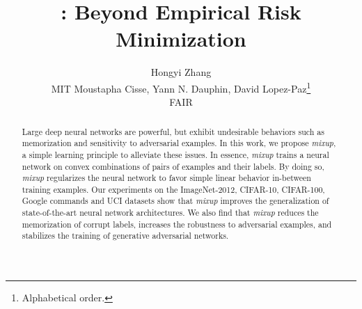 \documentclass{article}
\title{\mixup{}: Beyond Empirical Risk Minimization}
\author{%
Hongyi Zhang \\
MIT
\And
Moustapha Cisse, Yann N. Dauphin, David Lopez-Paz\thanks{Alphabetical order.} \\
FAIR
}
\newcommand{\mixup}{\emph{mixup}}
\begin{document}
    \maketitle
    \begin{abstract}
        Large deep neural networks are powerful, but exhibit undesirable
        behaviors such as memorization and sensitivity to adversarial examples.
        In this work, we propose \mixup{}, a simple learning principle to
        alleviate these issues. In essence, \mixup{} trains a neural network on
        convex combinations of pairs of examples and their labels.  By doing
        so, \mixup{} regularizes the neural network to favor simple linear
        behavior in-between training examples.  Our experiments on the
        ImageNet-2012, CIFAR-10, CIFAR-100, Google commands and UCI datasets
        show that \mixup{} improves the generalization of state-of-the-art
        neural network architectures.  We also find that \mixup{} reduces the
        memorization of corrupt labels, increases the robustness to adversarial
        examples, and stabilizes the training of generative adversarial
        networks.
    \end{abstract}
    
    
    
	
    
    {\small
        
        }
\end{document}

